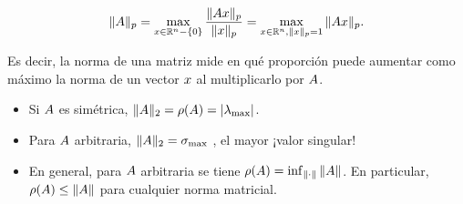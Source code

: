 $$
\|\Ab\|_p = \max_{\xb \in \R^n - \{0\}} \frac{\|\Ab\xb\|_p}{\|x\|_p} = \max_{\xb \in \R^n, \|\xb\|_p = 1} \|\Ab\xb\|_p.
$$

Es decir, la norma de una matriz mide en qué proporción puede aumentar como máximo la norma de un vector $\xb$ al multiplicarlo por $\Ab$.

\begin{prop}\leavevmode
\begin{itemize}
\item Si $\Ab$ es simétrica, $\|\Ab\|_2 = \rho(\Ab) = |\lambda_{\max}|$.
\item Para $\Ab$ arbitraria, $\|\Ab\|_2 = \sigma_{\max}$ , el mayor ¡valor singular!
\item En general, para $\Ab$ arbitraria se tiene $\rho(\Ab) = \inf_{\|\cdot\|} \|\Ab\|$. En particular, $\rho(\Ab) \le \|\Ab\|$ para cualquier norma matricial.
\end{itemize}
\end{prop}

